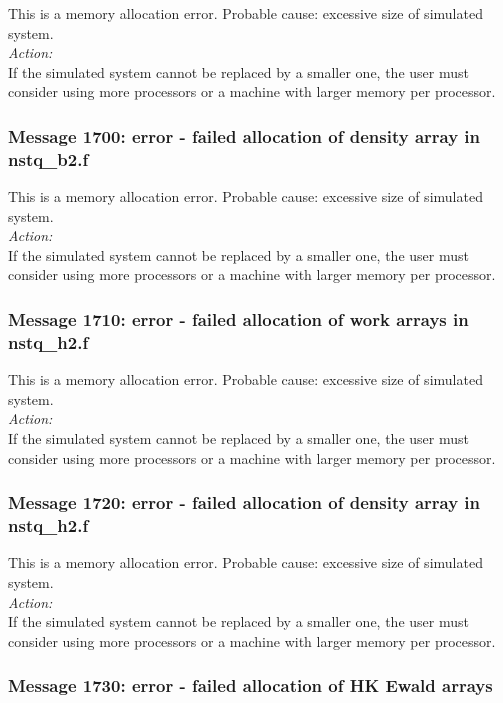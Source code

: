 This is a memory allocation error. Probable cause: excessive size of
simulated system. \\

\noindent
{\em Action:}\\
If the simulated system cannot be replaced by a smaller one, the user
must consider using more processors or a machine with larger memory
per processor.

\subsubsection*{Message 1700: error - failed allocation of density
array in nstq\_b2.f}

This is a memory allocation error. Probable cause: excessive size of
simulated system. \\

\noindent
{\em Action:}\\
If the simulated system cannot be replaced by a smaller one, the user
must consider using more processors or a machine with larger memory
per processor.

\subsubsection*{Message 1710: error - failed allocation of work arrays
in nstq\_h2.f}

This is a memory allocation error. Probable cause: excessive size of
simulated system. \\

\noindent
{\em Action:}\\
If the simulated system cannot be replaced by a smaller one, the user
must consider using more processors or a machine with larger memory
per processor.

\subsubsection*{Message 1720: error - failed allocation of density
array in nstq\_h2.f}

This is a memory allocation error. Probable cause: excessive size of
simulated system. \\

\noindent
{\em Action:}\\
If the simulated system cannot be replaced by a smaller one, the user
must consider using more processors or a machine with larger memory
per processor.

\subsubsection*{Message 1730: error - failed allocation of HK Ewald
arrays}

